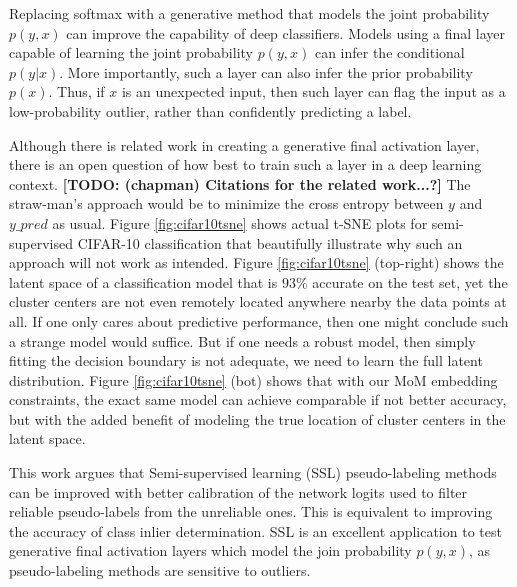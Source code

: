 \documentclass[10pt,twocolumn,letterpaper]{article}
\newcommand{\TODO}[1]{\textbf{\color{red}[TODO: #1]}}
\begin{document}
Replacing softmax with a generative method that models the joint probability $p(y,x)$ can improve the capability of deep classifiers. 
Models using a final layer capable of learning the joint probability $p(y,x)$ can infer the conditional $p(y|x)$.
More importantly, such a layer can also infer the prior probability $p(x)$.
Thus, if $x$ is an unexpected input, then such layer can flag the input as a low-probability outlier, rather than confidently predicting a label.

Although there is related work in creating a generative final activation layer, there is an open question of how best to train such a layer in a deep learning context.  \TODO{(chapman) Citations for the related work...?}
The straw-man’s approach would be to minimize the cross entropy between $y$ and $y\_pred$ as usual.  
Figure \ref{fig:cifar10tsne} shows actual t-SNE plots for semi-supervised CIFAR-10 \cite{cifar10} classification that beautifully illustrate why such an approach will not work as intended.  
Figure \ref{fig:cifar10tsne} (top-right) shows the latent space of a classification model that is $93\%$ accurate on the test set, yet the cluster centers are not even remotely located anywhere nearby the data points at all.  
If one only cares about predictive performance, then one might conclude such a strange model would suffice.  
But if one needs a robust model, then simply fitting the decision boundary is not adequate, we need to learn the full latent distribution. 
Figure \ref{fig:cifar10tsne} (bot) shows that with our MoM embedding constraints, the exact same model can achieve comparable if not better accuracy, but with the added benefit of modeling the true location of cluster centers in the latent space.

%	


This work argues that Semi-supervised learning (SSL) pseudo-labeling methods can be improved with better calibration of the network logits used to filter reliable pseudo-labels from the unreliable ones. 
This is equivalent to improving the accuracy of class inlier determination.
SSL is an excellent application to test generative final activation layers which model the join probability $p(y,x)$, as pseudo-labeling methods are sensitive to outliers.
\end{document}
